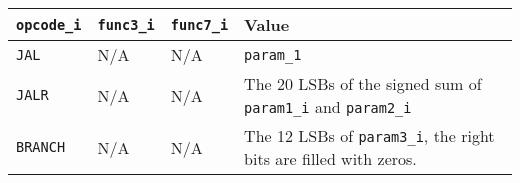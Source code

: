 {
\footnotesize
\begin{tabularx}{0.9\textwidth}{|l|l|l|X|}
  \hline
  \cellcolor{gray!20}\textbf{\texttt{opcode\_i}} & \cellcolor{gray!20}\textbf{\texttt{func3\_i}} & \cellcolor{gray!20}\textbf{\texttt{func7\_i}} & \cellcolor{gray!20}\textbf{Value} \\
  \hline
  \texttt{JAL} & N/A & N/A & \texttt{param\_1} \\
  \hline
  \texttt{JALR} & N/A & N/A & The 20 LSBs of the signed sum of \texttt{param1\_i} and \texttt{param2\_i} \\
  \hline
  \texttt{BRANCH} & N/A & N/A & The 12 LSBs of \texttt{param3\_i}, the right bits are filled with zeros. \\
  \hline
\end{tabularx}
}
